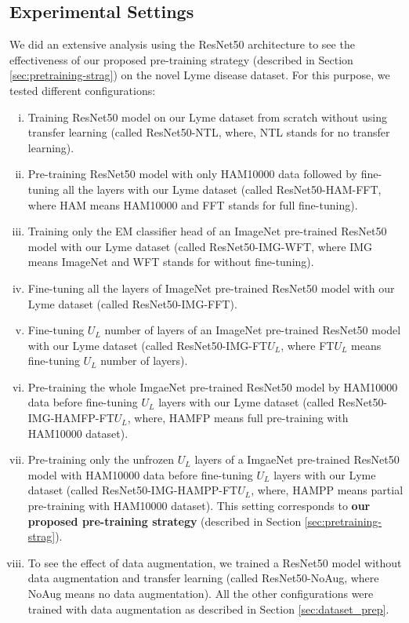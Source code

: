 \subsection{Experimental Settings}\label{sec:exp_settings}
We did an extensive analysis using the ResNet50 architecture to see the effectiveness of our proposed pre-training strategy (described in Section \ref{sec:pretraining-strag}) on the novel Lyme disease dataset. For this purpose, we tested different configurations:
\begin{enumerate}[i.]
	
	\item Training ResNet50 model on our Lyme dataset from scratch without using transfer learning (called ResNet50-NTL, where, NTL stands for no transfer learning).
	
	\item Pre-training ResNet50 model with only HAM10000 data followed by fine-tuning all the layers with our Lyme dataset (called ResNet50-HAM-FFT, where HAM means HAM10000 and FFT stands for full fine-tuning).
	
	\item Training only the EM classifier head of an ImageNet pre-trained ResNet50 model with our Lyme dataset (called ResNet50-IMG-WFT, where IMG means ImageNet and WFT stands for without fine-tuning).
	
	\item Fine-tuning all the layers of ImageNet pre-trained ResNet50 model with our Lyme dataset (called ResNet50-IMG-FFT).
	
	\item Fine-tuning $U_L$ number of layers of an ImageNet pre-trained ResNet50 model with our Lyme dataset (called ResNet50-IMG-FT$U_L$, where FT${U_L}$ means fine-tuning $U_L$ number of layers).
	
	\item Pre-training the whole ImgaeNet pre-trained ResNet50 model by HAM10000 data before fine-tuning $U_L$ layers with our Lyme dataset (called ResNet50-IMG-HAMFP-FT$U_L$, where, HAMFP means full pre-training with HAM10000 dataset).
	
	\item Pre-training only the unfrozen $U_L$ layers of a ImgaeNet pre-trained ResNet50 model with HAM10000 data before fine-tuning $U_L$ layers with our Lyme dataset (called  ResNet50-IMG-HAMPP-FT$U_L$, where, HAMPP means partial pre-training with HAM10000 dataset). This setting corresponds to \textbf{our proposed pre-training strategy} (described in Section \ref{sec:pretraining-strag}).
	
	\item To see the effect of data augmentation, we trained a ResNet50 model without data augmentation and transfer learning (called ResNet50-NoAug, where NoAug means no data augmentation). All the other configurations were trained with data augmentation as described in Section \ref{sec:dataset_prep}. 
\end{enumerate}
